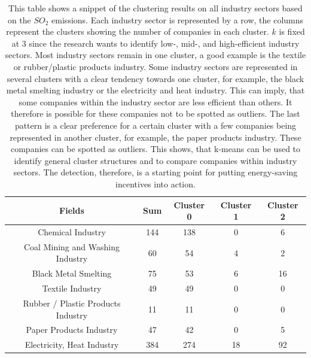 \begin{table}[h]
    \centering
    \begin{tabular}{|c|c|c|c|c|}
        \hline
        \textbf{Fields} & \textbf{Sum} & \textbf{Cluster 0} & \textbf{Cluster 1} & \textbf{Cluster 2} \\
        \hline
        Chemical Industry & 144 & 138 & 0 & 6 \\
        Coal Mining and Washing Industry & 60 & 54 & 4 & 2 \\
        Black Metal Smelting & 75 & 53 & 6 & 16 \\
        Textile Industry & 49 & 49 & 0 & 0 \\
        Rubber / Plastic Products Industry & 11 & 11 & 0 & 0 \\
        Paper Products Industry & 47 & 42 & 0 & 5 \\
        Electricity, Heat Industry & 384 & 274 & 18 & 92 \\
        \hline
    \end{tabular}
    \caption{This table shows a snippet of the clustering results on all industry sectors based on the $SO_2$ emissions.
    Each industry sector is represented by a row, the columns represent the clusters showing the number of companies in each cluster.
    $k$ is fixed at $3$ since the research wants to identify low-, mid-, and high-efficient industry sectors.
    Most industry sectors remain in one cluster, a good example is the textile or rubber/plastic products industry.
    Some industry sectors are represented in several clusters with a clear tendency towards one cluster, for example, the black metal smelting industry or the electricity and heat industry.
    This can imply, that some companies within the industry sector are less efficient than others.
    It therefore is possible for these companies not to be spotted as outliers.
    The last pattern is a clear preference for a certain cluster with a few companies being represented in another cluster, for example, the paper products industry.
    These companies can be spotted as outliers.
    This shows, that k-means can be used to identify general cluster structures and to compare companies within industry sectors.
    The detection, therefore, is a starting point for putting energy-saving incentives into action.
    }
    \label{tab:multi_industries_clustering_results_based_on_the_so2_emission}
\end{table}

